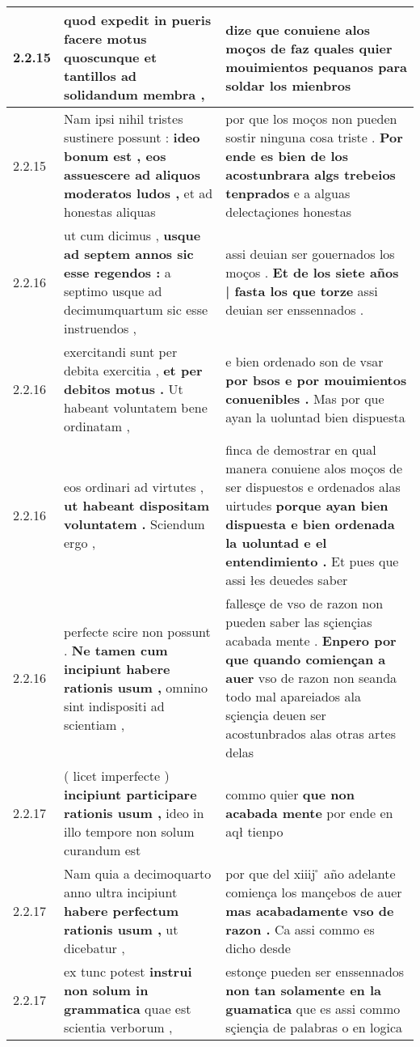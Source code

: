 \begin{tabular}{|p{1cm}|p{6.5cm}|p{6.5cm}|}
2.2.15 & quod expedit in pueris \textbf{ facere motus quoscunque } et tantillos ad solidandum membra , & dize \textbf{ que conuiene alos moços de faz quales quier mouimientos pequanos } para soldar los mienbros \\\hline
2.2.15 & Nam ipsi nihil tristes sustinere possunt : \textbf{ ideo bonum est , eos assuescere ad aliquos moderatos ludos , } et ad honestas aliquas & por que los moços non pueden sostir ninguna cosa triste . \textbf{ Por ende es bien de los acostunbrara algs trebeios tenprados } e a alguas delectaçiones honestas \\\hline
2.2.16 & ut cum dicimus , \textbf{ usque ad septem annos sic esse regendos : } a septimo usque ad decimumquartum sic esse instruendos , & assi deuian ser gouernados los moços . \textbf{ Et de los siete años | fasta los que torze } assi deuian ser enssennados . \\\hline
2.2.16 & exercitandi sunt per debita exercitia , \textbf{ et per debitos motus . } Ut habeant voluntatem bene ordinatam , & e bien ordenado son de vsar \textbf{ por bsos e por mouimientos conuenibles . } Mas por que ayan la uoluntad bien dispuesta \\\hline
2.2.16 & eos ordinari ad virtutes , \textbf{ ut habeant dispositam voluntatem . } Sciendum ergo , & finca de demostrar en qual manera conuiene alos moços de ser dispuestos e ordenados alas uirtudes \textbf{ porque ayan bien dispuesta e bien ordenada la uoluntad e el entendimiento . } Et pues que assi łes deuedes saber \\\hline
2.2.16 & perfecte scire non possunt . \textbf{ Ne tamen cum incipiunt habere rationis usum , } omnino sint indispositi ad scientiam , & fallesçe de vso de razon non pueden saber las sçiençias acabada mente . \textbf{ Enpero por que quando comiençan a auer } vso de razon non seanda todo mal apareiados ala sçiençia deuen ser acostunbrados alas otras artes delas \\\hline
2.2.17 & ( licet imperfecte ) \textbf{ incipiunt participare rationis usum , } ideo in illo tempore non solum curandum est & commo quier \textbf{ que non acabada mente } por ende en aqł tienpo \\\hline
2.2.17 & Nam quia a decimoquarto anno ultra incipiunt \textbf{ habere perfectum rationis usum , } ut dicebatur , & por que del xiiij ̊ año adelante comiença los mançebos de auer \textbf{ mas acabadamente vso de razon . } Ca assi commo es dicho desde \\\hline
2.2.17 & ex tunc potest \textbf{ instrui non solum in grammatica } quae est scientia verborum , & estonçe pueden ser enssennados \textbf{ non tan solamente en la guamatica } que es assi commo sçiençia de palabras o en logica \\\hline

\end{tabular}
